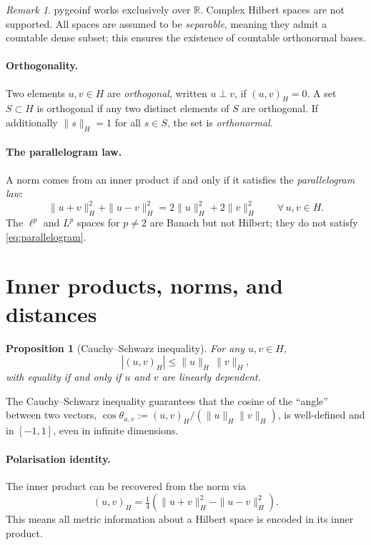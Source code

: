 \documentclass[11pt,twoside,openright]{book}
\theoremstyle{plain}
\newtheorem{proposition}[theorem]{Proposition}
\theoremstyle{definition}
\theoremstyle{remark}
\newtheorem*{remark}{Remark}
\begin{document}
\begin{remark}
pygeoinf works exclusively over $\mathbb{R}$. Complex Hilbert spaces are not
supported. All spaces are assumed to be \emph{separable}, meaning they
admit a countable dense subset; this ensures the existence of countable
orthonormal bases.
\end{remark}

\paragraph{Orthogonality.}
Two elements $u, v \in H$ are \emph{orthogonal}, written $u \perp v$, if
$(u, v)_H = 0$. A set $S \subset H$ is orthogonal if any two distinct
elements of $S$ are orthogonal. If additionally $\|s\|_H = 1$ for all
$s \in S$, the set is \emph{orthonormal}.

\paragraph{The parallelogram law.}
A norm comes from an inner product if and only if it satisfies the
\emph{parallelogram law}:
\begin{equation}
  \label{eq:parallelogram}
  \|u + v\|^2_H + \|u - v\|^2_H = 2\|u\|^2_H + 2\|v\|^2_H
  \qquad \forall\, u, v \in H.
\end{equation}
The $\ell^p$ and $L^p$ spaces for $p \neq 2$ are Banach but not Hilbert;
they do not satisfy \eqref{eq:parallelogram}.

\section{Inner products, norms, and distances}
\label{sec:inner-products-norms}

\begin{proposition}[Cauchy--Schwarz inequality]
\label{prop:cauchy-schwarz}
For any $u, v \in H$,
\begin{equation}
  \label{eq:cauchy-schwarz}
  |(u, v)_H| \leq \|u\|_H \, \|v\|_H,
\end{equation}
with equality if and only if $u$ and $v$ are linearly dependent.
\end{proposition}

The Cauchy--Schwarz inequality guarantees that the cosine of the
``angle'' between two vectors, $\cos\theta_{u,v} := (u,v)_H / (\|u\|_H
\|v\|_H)$, is well-defined and in $[-1,1]$, even in infinite dimensions.

\paragraph{Polarisation identity.}
The inner product can be recovered from the norm via
\begin{equation}
  \label{eq:polarisation}
  (u, v)_H = \tfrac{1}{4}\left(\|u + v\|^2_H - \|u - v\|^2_H\right).
\end{equation}
This means all metric information about a Hilbert space is encoded in
its inner product.
\end{document}
